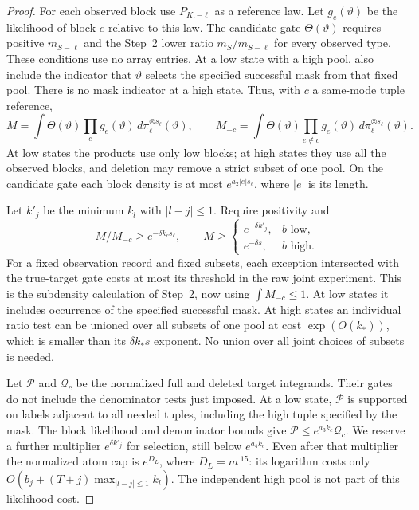 \begin{proof}
For each observed block use \(P_{K,-\ell}\) as a reference law. Let
\(g_e(\vartheta)\) be the likelihood of block \(e\) relative to this
law. The candidate gate \(\Theta(\vartheta)\) requires positive
\(m_{S-\ell}\) and the Step~2 lower ratio \(m_S/m_{S-\ell}\) for every
observed type. These conditions use no array entries. At a low state
with a high pool, also include the indicator that \(\vartheta\) selects
the specified successful mask from that fixed pool. There is no mask
indicator at a high state. Thus, with \(c\) a same-mode tuple reference,
\[
 M=\int\Theta(\vartheta)\prod_e g_e(\vartheta)
       \,d\pi_\ell^{\otimes s_\ell}(\vartheta),\qquad
 M_{-c}=\int\Theta(\vartheta)\prod_{e\notin c}g_e(\vartheta)
       \,d\pi_\ell^{\otimes s_\ell}(\vartheta).
\]
At low states the products use only low blocks; at high states they use
all the observed blocks, and deletion may remove a strict subset of one
pool. On the candidate gate each block density is at most
\(e^{a_2|e|s_\ell}\), where \(|e|\) is its length.

Let \(k'_j\) be the minimum \(k_l\) with \(|l-j|\le1\). Require
positivity and
\[
 M/M_{-c}\ge e^{-\delta k_cs_\ell},\qquad
 M\ge
 \begin{cases}
 e^{-\delta k'_j},&b\text{ low},\\
 e^{-\delta s},&b\text{ high}.
 \end{cases}
\]
For a fixed observation record and fixed subsets, each exception
intersected with the
true-target gate costs at most its threshold in the raw joint experiment.
This is the subdensity calculation of Step~2, now using
\(\int M_{-c}\le1\). At low states it includes occurrence of the
specified successful mask. At high states an individual ratio test can
be unioned over all subsets of one pool at cost \(\exp(O(k_*))\),
which is smaller than its \(\delta k_*s\) exponent. No union over all
joint choices of subsets is needed.

Let \(\mathcal P\) and \(\mathcal Q_c\) be the normalized full and
deleted target integrands. Their gates do not include the denominator
tests just imposed. At a low state, \(\mathcal P\) is supported on
labels adjacent to all needed tuples, including the high tuple specified
by the mask. The block likelihood and denominator bounds give
\(\mathcal P\le e^{a_3k_c}\mathcal Q_c\). We reserve a further
multiplier \(e^{\delta k'_j}\) for selection, still below
\(e^{a_4k_c}\). Even after that multiplier the normalized atom cap is
\(e^{D_L}\), where \(D_L=m^{.15}\): its logarithm costs only
\(O(b_j+(T+j)\max_{|l-j|\le1}k_l)\). The independent high pool is not
part of this likelihood cost.


\end{proof}
